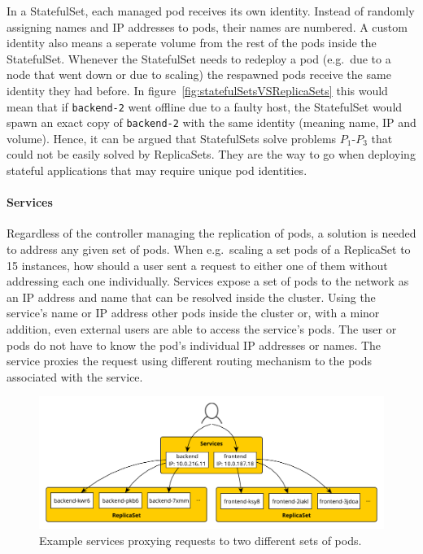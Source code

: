 In a StatefulSet, each managed pod receives its own identity. Instead of
randomly assigning names and \ac{IP} addresses to pods, their names are
numbered. A custom identity also means a seperate volume from the rest of the
pods inside the StatefulSet. Whenever the StatefulSet needs to redeploy a pod
(e.g.\ due to a node that went down or due to scaling) the respawned pods
receive the same identity they had before. In
figure~\ref{fig:statefulSetsVSReplicaSets} this would mean that if
\texttt{backend-2} went offline due to a faulty host, the StatefulSet would
spawn an exact copy of \texttt{backend-2} with the same identity (meaning name,
\ac{IP} and volume). Hence, it can be argued that StatefulSets solve problems
$P_1$-$P_3$ that could not be easily solved by ReplicaSets. They are the way to
go when deploying stateful applications that may require unique pod identities.

\paragraph{Services}%
\label{par:Services}
Regardless of the controller managing the replication of pods, a solution is
needed to address any given set of pods. When e.g.\ scaling a set pods of a
ReplicaSet to 15 instances, how should a user sent a request to either one of
them without addressing each one individually. Services expose a set of pods to
the network as an \ac{IP} address and name that can be resolved inside the
cluster. Using the service's name or \ac{IP} address other pods inside the
cluster or, with a minor addition, even external users are able to access the
service's pods. The user or pods do not have to know the pod's individual
\ac{IP} addresses or names. The service proxies the request using different
routing mechanism \autocite{AuthorsService2019} to the pods associated with the
service.

\begin{figure}[H]
\begin{center}
  \includegraphics[scale=0.55]{images/figures/service_example.pdf}
\end{center}
\caption{Example services proxying requests to two different sets of pods.}%
\label{fig:services_example}
\end{figure}

